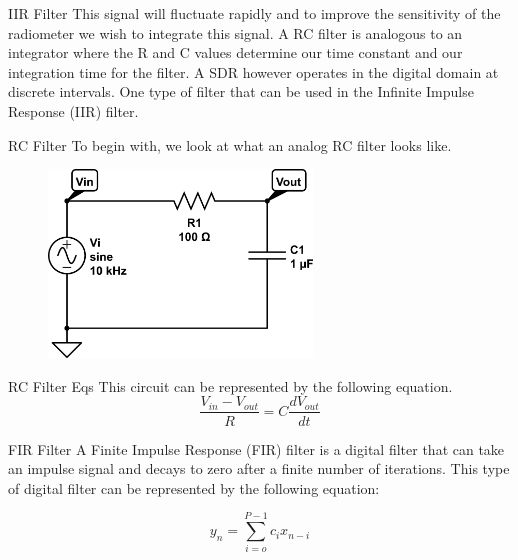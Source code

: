 \documentclass{beamer}
\begin{document}
\begin{frame}
\begin{block}{IIR Filter}
This signal will fluctuate rapidly and to improve the sensitivity of the radiometer we wish to integrate this signal.  A RC filter is analogous to an integrator where the R and C values determine our time constant and our integration time for the filter.  A SDR however operates in the digital domain at discrete intervals.  One type of filter that can be used in the Infinite Impulse Response (IIR) filter. 
\end{block}
\end{frame}

\begin{frame}
\begin{block}{RC Filter}
To begin with, we look at what an analog RC filter looks like. 

{\begin{figure}[h!tb] 
\centering
\includegraphics[width=7cm]{../Images/rc-circuit.png}
\label{rc_circuit}
\end{figure}
}
\end{block}
\end{frame}

\begin{frame}
\begin{block}{RC Filter Eqs}
This circuit can be represented by the following equation.
\begin{equation}\label{eq:rc_circuit_eq}
\frac{V_{in}-V_{out}}{R}=C\frac{dV_{out}}{dt}
\end{equation}
\end{block}
\end{frame}

\begin{frame}
\begin{block}{FIR Filter}
A Finite Impulse Response (FIR) filter is a digital filter that can take an impulse signal and decays to zero after a finite number of iterations.  This type of digital filter can be represented by the following equation:

\begin{equation}\label{IIR_yn}
y_n=\displaystyle\sum\limits_{i=o}^{P-1} c_ix_{n-i}
\end{equation}
\end{block}
\end{frame}
\end{document}
